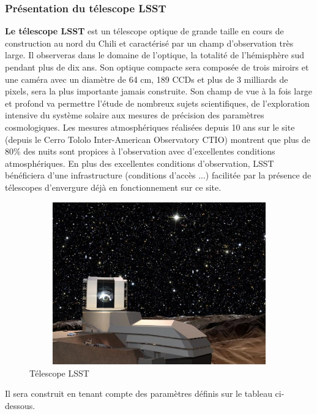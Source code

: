 \subsubsection{Présentation du télescope LSST}
\textbf{Le télescope LSST} est un télescope optique de grande taille en cours de construction au nord du Chili et caractérisé par un champ d’observation très large. Il observeras dans le domaine de l'optique, la totalité de l'hémisphère sud pendant plus de dix ans.
Son optique compacte sera composée de trois miroirs et une caméra avec un diamètre de 64 cm, 189 CCDs et plus de 3 milliards de pixels, sera la plus importante jamais construite. Son champ de vue à la fois large et profond va permettre l'étude de nombreux sujets scientifiques, de l'exploration intensive du système solaire aux mesures de précision des paramètres cosmologiques. 
Les mesures atmosphériques réalisées depuis 10 ans sur le site (depuis le Cerro Tololo Inter-American Observatory CTIO) montrent que plus de 80\% des nuits sont propices à l'observation avec d'excellentes conditions atmosphériques.
En plus des excellentes conditions d'observation, LSST bénéficiera d'une infrastructure (conditions d'accès ...) facilitée par la présence de télescopes d'envergure déjà en fonctionnement sur ce site. 
\newline
\newline
\begin{figure}[!h]
    \centering
    \includegraphics[width=12cm,height=7cm]{report/figures/LSST.jpg}
    \caption{Télescope LSST}
    \label{fig:modeling_shema}
\end{figure}
\newline Il sera construit en tenant compte des paramètres définis sur le tableau ci-dessous.
\newline
